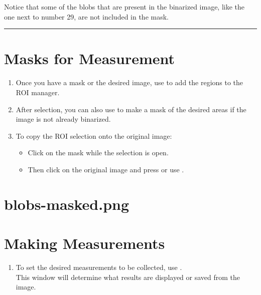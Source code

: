 \documentclass[letterpaper,10pt,english]{jupyterBook}
\begin{document}
\begin{sphinxVerbatim}[commandchars=\\\{\}]
 \PYGZgt{} Notice that some of the blobs that are present in the binarized image, like the one next to number 29, are not included in the mask.
\end{sphinxVerbatim}


\bigskip\hrule\bigskip



\section{Masks for Measurement}
\label{\detokenize{basic-segmentation:masks-for-measurement}}\begin{enumerate}
%
\item {} 
\sphinxAtStartPar
Once you have a mask or the desired image, use  to add the regions to the ROI manager.

\item {} 
\sphinxAtStartPar
After selection, you can also use  to make a mask of the desired areas if the image is not already binarized.

\item {} 
\sphinxAtStartPar
To copy the ROI selection onto the original image:
\begin{itemize}
\item {} 
\sphinxAtStartPar
Click on the mask while the selection is open.

\item {} 
\sphinxAtStartPar
Then click on the original image and press  or use .

\end{itemize}

\end{enumerate}


\section[]{\lowercase{\sphinxincludegraphics}{{blobs-masked}.png}}
\label{\detokenize{basic-segmentation:id1}}

\section{Making Measurements}
\label{\detokenize{basic-segmentation:making-measurements}}\begin{enumerate}
%
\item {} 
\sphinxAtStartPar
To set the desired measurements to be collected, use .\\
This window will determine what results are displayed or saved from the image.

\end{enumerate}
\end{document}

